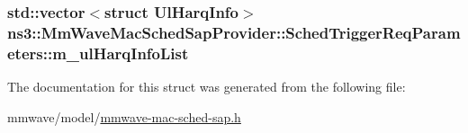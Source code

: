 \subsubsection[{\texorpdfstring{m\+\_\+ul\+Harq\+Info\+List}{m_ulHarqInfoList}}]{\setlength{\rightskip}{0pt plus 5cm}std\+::vector$<$struct {\bf Ul\+Harq\+Info}$>$ ns3\+::\+Mm\+Wave\+Mac\+Sched\+Sap\+Provider\+::\+Sched\+Trigger\+Req\+Parameters\+::m\+\_\+ul\+Harq\+Info\+List}\hypertarget{structns3_1_1MmWaveMacSchedSapProvider_1_1SchedTriggerReqParameters_ab8392720748eefb0b48e1e52c02c98dd}{}\label{structns3_1_1MmWaveMacSchedSapProvider_1_1SchedTriggerReqParameters_ab8392720748eefb0b48e1e52c02c98dd}


The documentation for this struct was generated from the following file\+:\begin{DoxyCompactItemize}
\item 
mmwave/model/\hyperlink{mmwave-mac-sched-sap_8h}{mmwave-\/mac-\/sched-\/sap.\+h}\end{DoxyCompactItemize}
